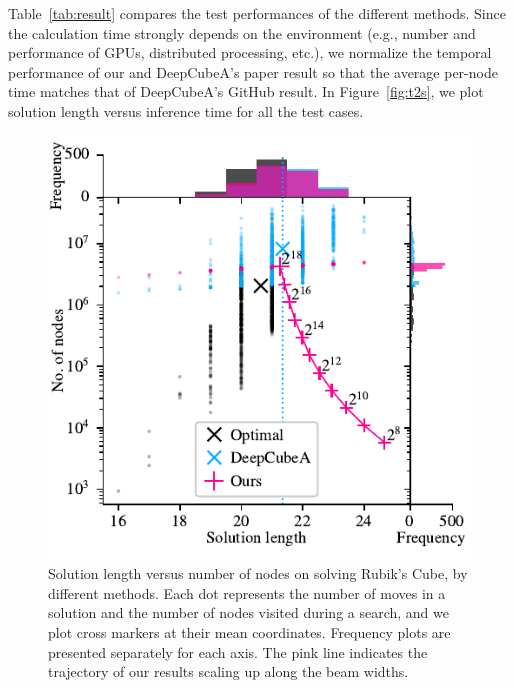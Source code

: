 \documentclass[nohyperref]{article}
\theoremstyle{plain}
\theoremstyle{definition}
\theoremstyle{remark}
\begin{document}
Table~\ref{tab:result} compares the test performances of the different methods.
Since the calculation time strongly depends on the environment (e.g., number and performance of GPUs, distributed processing, etc.), we normalize the temporal performance of our and DeepCubeA's paper result so that the average per-node time matches that of DeepCubeA's GitHub result.
In Figure~\ref{fig:t2s}, we plot solution length versus inference time for all the test cases.


\begin{figure}[t]
    \centering
    \includegraphics[width=1.0\columnwidth]{figures/results.nodes_solutions.pdf}
    \vspace{-1em}
    \caption{
        Solution length versus number of nodes on solving Rubik's Cube, by different methods.
        Each dot represents the number of moves in a solution and the number of nodes visited during a search, and we plot cross markers at their mean coordinates.
        Frequency plots are presented separately for each axis.
        The pink line indicates the trajectory of our results scaling up along the beam widths.
    }
    \label{fig:s2n}
    \vspace{-2mm}
\end{figure}
\end{document}
